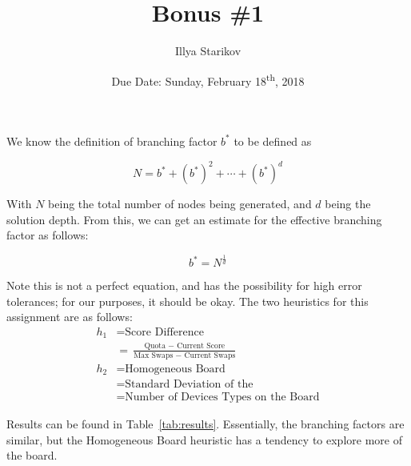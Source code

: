 \documentclass[12pt]{scrartcl}
\title{Bonus \#1}
\date{Due Date: Sunday, February 18\textsuperscript{th}, 2018}
\author{Illya Starikov}
\begin{document}
\maketitle

We know the definition of branching factor $b^*$ to be defined as

\begin{equation*}
    N = b^* + {(b^*)}^2 + \cdots + {(b^*)}^d
\end{equation*}

With $N$ being the total number of nodes being generated, and $d$ being the solution depth. From this, we can get an estimate for the effective branching factor as follows:

\begin{equation*}
    b^* = N^{\frac{1}{d}}
\end{equation*}

Note this is not a perfect equation, and has the possibility for high error tolerances; for our purposes, it should be okay. The two heuristics for this assignment are as follows:
\begin{align*}
    h_1 &= \text{Score Difference} \\
        &= \frac{\text{Quota $-$ Current Score}}{\text{Max Swaps $-$ Current Swaps}} \\
    h_2 &= \text{Homogeneous Board} \\
        &= \text{Standard Deviation of the} \\
        &= \text{Number of Devices Types on the Board}
\end{align*}


Results can be found in Table~\ref{tab:results}. Essentially, the branching factors are similar, but the Homogeneous Board heuristic has a tendency to explore more of the board.

\begin{table}[H]
    \centering
    \caption{The computations for the effective branching factor.}
    \label{tab:results}
\end{table}
\end{document}
